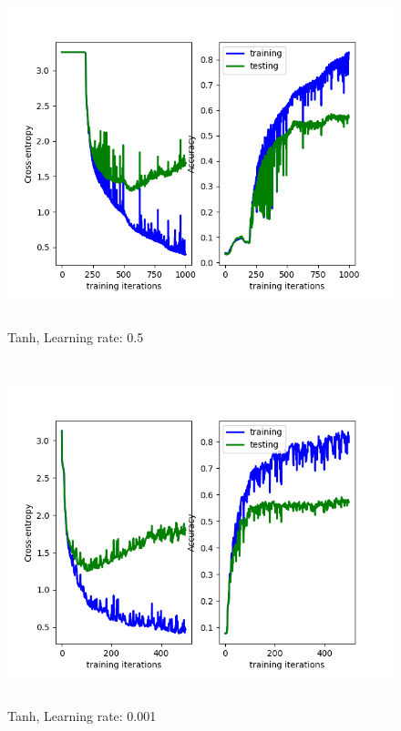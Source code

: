 \documentclass[a4paper]{article}
\begin{document}
   \begin{figure}[h]
\caption{Tanh, Learning rate: 0.5}
\centering
\includegraphics[width=12cm, height=10cm]{LR05.png}
\end{figure}

   \begin{figure}[h]
\caption{Tanh, Learning rate: 0.001}
\centering
\includegraphics[width=12cm, height=10cm]{LR001.png}
\end{figure}

    
\end{document}
